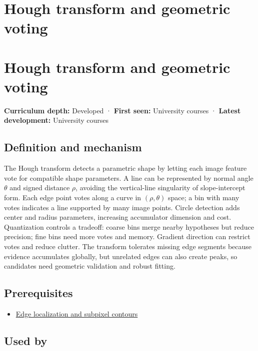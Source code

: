 \hypertarget{appendix-a5b0383b3b3e}{}
\section*{Hough transform and geometric voting}
\section{Hough transform and geometric voting}\label{hough-transform-and-geometric-voting}

\textbf{Curriculum depth:} Developed · \textbf{First seen:} University courses · \textbf{Latest development:} University courses

\subsection{Definition and mechanism}\label{definition-and-mechanism}

The Hough transform detects a parametric shape by letting each image feature vote for compatible shape parameters. A line can be represented by normal angle \(\theta\) and signed distance \(\rho\), avoiding the vertical-line singularity of slope-intercept form. Each edge point votes along a curve in \((\rho,\theta)\) space; a bin with many votes indicates a line supported by many image points. Circle detection adds center and radius parameters, increasing accumulator dimension and cost. Quantization controls a tradeoff: coarse bins merge nearby hypotheses but reduce precision; fine bins need more votes and memory. Gradient direction can restrict votes and reduce clutter. The transform tolerates missing edge segments because evidence accumulates globally, but unrelated edges can also create peaks, so candidates need geometric validation and robust fitting.

\subsection{Prerequisites}\label{prerequisites}

\begin{itemize}
\tightlist
\item
  \hyperref[appendix-36022286b03e]{Edge localization and subpixel contours}
\end{itemize}

\subsection{Used by}\label{used-by}

